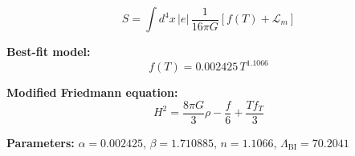 
\begin{equation}
  S = \int d^4x \, |e| \, \frac{1}{16\pi G} \left[ f(T) + \mathcal{L}_m \right]
\end{equation}

\textbf{Best-fit model:}
\begin{equation}
  f(T) = 0.002425 \, T^{1.1066}
\end{equation}

\textbf{Modified Friedmann equation:}
\begin{equation}
  H^2 = \frac{8\pi G}{3} \rho - \frac{f}{6} + \frac{T f_T}{3}
\end{equation}

\textbf{Parameters:}
$\alpha = 0.002425$, \quad
$\beta = 1.710885$, \quad
$n = 1.1066$, \quad
$\Lambda_{\text{BI}} = 70.2041$